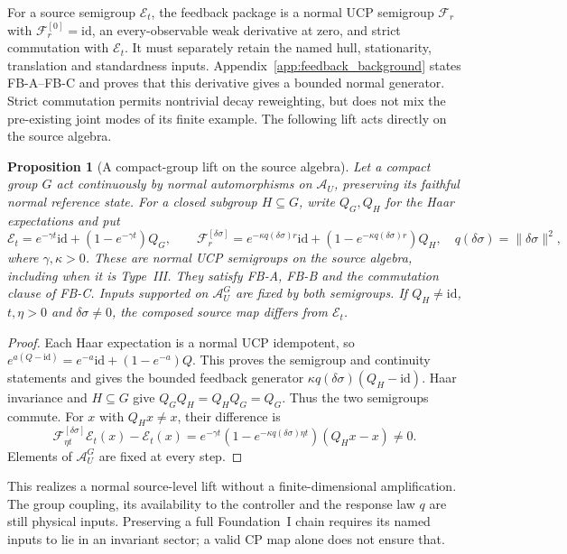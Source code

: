 \documentclass[12pt]{article}
\newtheorem{proposition}[theorem]{Proposition}
\theoremstyle{definition}
\theoremstyle{remark}
\begin{document}
For a source semigroup $\mathcal E_t$, the feedback package is a
normal UCP semigroup $\mathscr F_r$ with $\mathscr F_r^{[0]}=\mathrm{id}$,
an every-observable weak derivative at zero, and strict commutation
with $\mathcal E_t$. It must separately retain the named hull,
stationarity, translation and standardness inputs.
Appendix~\ref{app:feedback_background} states FB-A--FB-C and proves
that this derivative gives a bounded normal generator.
Strict commutation permits nontrivial decay reweighting, but does
not mix the pre-existing joint modes of its finite example.
The following lift acts directly on the source algebra.

\begin{proposition}[A compact-group lift on the source algebra]
\label{prop:compactlift}
Let a compact group \(G\) act continuously by normal automorphisms on
\(\mathcal A_U\), preserving its faithful normal reference state.
For a closed subgroup \(H\subseteq G\), write \(Q_G,Q_H\) for the Haar
expectations and put
\[
 \mathcal E_t=e^{-\gamma t}\mathrm{id}+(1-e^{-\gamma t})Q_G,\qquad
 \mathscr F_r^{[\delta\sigma]}
 =e^{-\kappa q(\delta\sigma)r}\mathrm{id}
   +(1-e^{-\kappa q(\delta\sigma)r})Q_H,
 \quad q(\delta\sigma)=\|\delta\sigma\|^2 ,
\]
where \(\gamma,\kappa>0\). These are normal UCP semigroups on the
source algebra, including when it is Type~III. They satisfy FB-A,
FB-B and the commutation clause of FB-C. Inputs supported on
\(\mathcal A_U^G\) are fixed by both semigroups.
If \(Q_H\ne\mathrm{id}\), \(t,\eta>0\) and \(\delta\sigma\ne0\),
the composed source map differs from \(\mathcal E_t\).
\end{proposition}
\begin{proof}
Each Haar expectation is a normal UCP idempotent, so
\(e^{a(Q-\mathrm{id})}=e^{-a}\mathrm{id}+(1-e^{-a})Q\).
This proves the semigroup and continuity statements and gives the
bounded feedback generator
\(\kappa q(\delta\sigma)(Q_H-\mathrm{id})\).
Haar invariance and \(H\subseteq G\) give
\(Q_GQ_H=Q_HQ_G=Q_G\). Thus the two semigroups commute.
For \(x\) with \(Q_Hx\ne x\), their difference is
\[
 \mathscr F_{\eta t}^{[\delta\sigma]}\mathcal E_t(x)-\mathcal E_t(x)
 =e^{-\gamma t}(1-e^{-\kappa q(\delta\sigma)\eta t})(Q_Hx-x)\ne0 .
\]
Elements of \(\mathcal A_U^G\) are fixed at every step.
\end{proof}

This realizes a normal source-level lift without a finite-dimensional
amplification. The group coupling, its availability to the controller
and the response law \(q\) are still physical inputs.
Preserving a full Foundation~I chain requires its named inputs to
lie in an invariant sector; a valid CP map alone does not ensure that.
\end{document}
